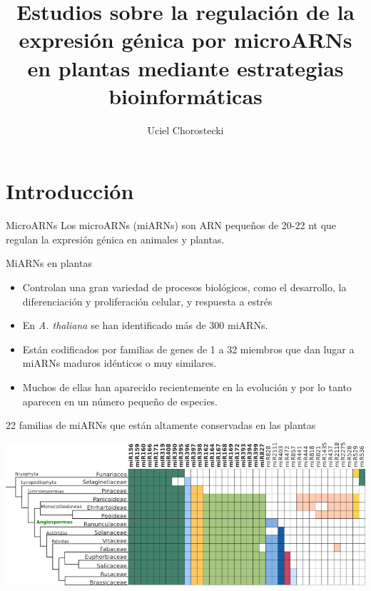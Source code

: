 \documentclass{beamer}
\title[]{Estudios sobre la regulación de la expresión génica por microARNs en plantas mediante estrategias bioinformáticas}
\author{Uciel Chorostecki}
\institute[IBR]{ \\Director Dr. Javier Palatnik\\Instituto Biología Molecular y Celular Rosario}
\date{}
\begin{document}
\frame{\titlepage}

\section{Introducción}

\begin{frame}{MicroARNs}
        Los microARNs (miARNs) son ARN pequeños de 20-22 nt que regulan la expresión génica en animales y plantas. 
\end{frame}


\begin{frame}{MiARNs en plantas}
    \begin{itemize}
        \item Controlan una gran variedad de procesos biológicos, como el desarrollo, la diferenciación y proliferación celular, y respuesta a estrés
        \item En \textit{A. thaliana} se han identificado más de 300 miARNs.
        \item Están codificados por familias de genes de 1 a 32 miembros que dan lugar a miARNs maduros idénticos o muy similares.
        \item Muchos de ellas han aparecido recientemente en la evolución y por lo tanto aparecen en un número pequeño de especies.
    \end{itemize}
\end{frame}

\begin{frame}{22 familias de miARNs que están altamente conservadas en las plantas}
	\begin{center}
		\includegraphics[width=1\textwidth]{img/familias_miRNAs_conservados.png}
	\end{center}
\end{frame}
\end{document}
